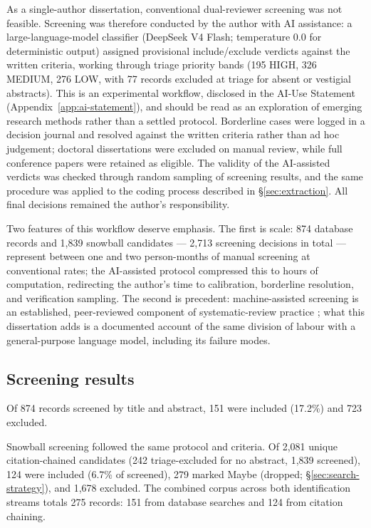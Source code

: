 As a single-author dissertation, conventional dual-reviewer screening was not feasible. Screening was therefore conducted by the author with AI assistance: a large-language-model classifier (DeepSeek V4 Flash; temperature 0.0 for deterministic output) assigned provisional include/exclude verdicts against the written criteria, working through triage priority bands (195 HIGH, 326 MEDIUM, 276 LOW, with 77 records excluded at triage for absent or vestigial abstracts). This is an experimental workflow, disclosed in the AI-Use Statement (Appendix~\ref{app:ai-statement}), and should be read as an exploration of emerging research methods rather than a settled protocol. Borderline cases were logged in a decision journal and resolved against the written criteria rather than ad hoc judgement; doctoral dissertations were excluded on manual review, while full conference papers were retained as eligible. The validity of the AI-assisted verdicts was checked through random sampling of screening results, and the same procedure was applied to the coding process described in §\ref{sec:extraction}. All final decisions remained the author's responsibility.

Two features of this workflow deserve emphasis. The first is scale: 874 database records and 1,839 snowball candidates — 2,713 screening decisions in total — represent between one and two person-months of manual screening at conventional rates; the AI-assisted protocol compressed this to hours of computation, redirecting the author's time to calibration, borderline resolution, and verification sampling. The second is precedent: machine-assisted screening is an established, peer-reviewed component of systematic-review practice \parencite{vandeschoot2021}; what this dissertation adds is a documented account of the same division of labour with a general-purpose language model, including its failure modes.

\subsection{Screening results}

Of 874 records screened by title and abstract, 151 were included (17.2\%) and 723 excluded.

Snowball screening followed the same protocol and criteria. Of 2,081 unique citation-chained candidates (242 triage-excluded for no abstract, 1,839 screened), 124 were included (6.7\% of screened), 279 marked Maybe (dropped; §\ref{sec:search-strategy}), and 1,678 excluded. The combined corpus across both identification streams totals 275 records: 151 from database searches and 124 from citation chaining.

